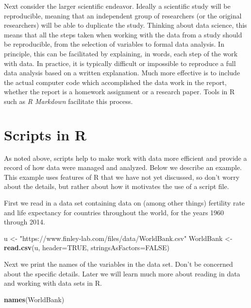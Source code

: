 \documentclass[
]{krantz}
\makeatletter
\newenvironment{Shaded}{\begin{snugshade}}{\end{snugshade}}
\newcommand{\DataTypeTok}[1]{\textcolor[rgb]{0.27,0.27,0.27}{#1}}
\newcommand{\KeywordTok}[1]{\textcolor[rgb]{0.27,0.27,0.27}{\textbf{#1}}}
\newcommand{\NormalTok}[1]{#1}
\newcommand{\OtherTok}[1]{\textcolor[rgb]{0.37,0.37,0.37}{#1}}
\newcommand{\StringTok}[1]{\textcolor[rgb]{0.5,0.5,0.5}{#1}}
\newenvironment{kframe}{%
\medskip{}
\setlength{\fboxsep}{.8em}
 \def\at@end@of@kframe{}%
 \ifinner\ifhmode%
  \def\at@end@of@kframe{\end{minipage}}%
  \begin{minipage}{\columnwidth}%
 \fi\fi%
 \def\FrameCommand##1{\hskip\@totalleftmargin \hskip-\fboxsep
 \colorbox{shadecolor}{##1}\hskip-\fboxsep
     \hskip-\linewidth \hskip-\@totalleftmargin \hskip\columnwidth}%
 \MakeFramed {\advance\hsize-\width
   \@totalleftmargin\z@ \linewidth\hsize
   \@setminipage}}%
 {\par\unskip\endMakeFramed%
 \at@end@of@kframe}
\renewenvironment{Shaded}{\begin{kframe}}{\end{kframe}}
\makeatother
\begin{document}
Next consider the larger scientific endeavor. Ideally a scientific study will be reproducible, meaning that an independent group of researchers (or the original researchers) will be able to duplicate the study. Thinking about data science, this means that all the steps taken when working with the data from a study should be reproducible, from the selection of variables to formal data analysis. In principle, this can be facilitated by explaining, in words, each step of the work with data. In practice, it is typically difficult or impossible to reproduce a full data analysis based on a written explanation. Much more effective is to include the actual computer code which accomplished the data work in the report, whether the report is a homework assignment or a research paper. Tools in R such as \emph{R Markdown} facilitate this process.

\hypertarget{scripts-in-r}{%
\section{Scripts in R}\label{scripts-in-r}}

As noted above, scripts help to make work with data more efficient and provide a record of how data were managed and analyzed. Below we describe an example. This example uses features of R that we have not yet discussed, so don't worry about the details, but rather about how it motivates the use of a script file.

First we read in a data set containing data on (among other things) fertility rate and life expectancy for countries throughout the world, for the years 1960 through 2014.

\begin{Shaded}
\begin{Highlighting}[]
\NormalTok{u \textless{}{-}}\StringTok{ "https://www.finley{-}lab.com/files/data/WorldBank.csv"}
\NormalTok{WorldBank \textless{}{-}}\StringTok{ }\KeywordTok{read.csv}\NormalTok{(u, }\DataTypeTok{header=}\OtherTok{TRUE}\NormalTok{, }\DataTypeTok{stringsAsFactors=}\OtherTok{FALSE}\NormalTok{)}
\end{Highlighting}
\end{Shaded}

Next we print the names of the variables in the data set. Don't be concerned about the specific details. Later we will learn much more about reading in data and working with data sets in R.

\begin{Shaded}
\begin{Highlighting}[]
\KeywordTok{names}\NormalTok{(WorldBank)}
\end{Highlighting}
\end{Shaded}
\end{document}

